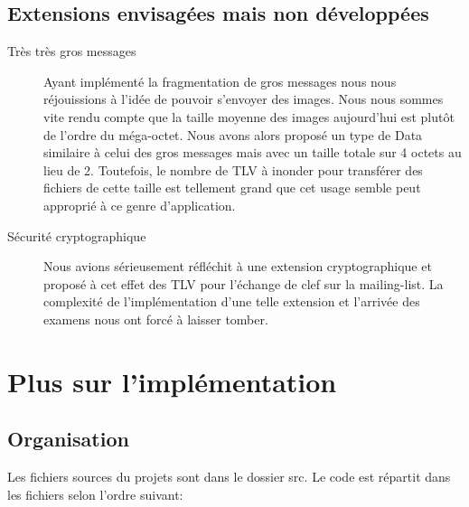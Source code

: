 \documentclass[a4paper,10pt]{article} %
\begin{document}
\subsection{Extensions envisagées mais non développées}

\begin{description}
\item[Très très gros messages] Ayant implémenté la fragmentation de gros messages nous nous réjouissions à l'idée de pouvoir s'envoyer des images. Nous nous sommes vite rendu compte que la taille moyenne des images aujourd'hui est plutôt de l'ordre du méga-octet. Nous avons alors proposé un type de Data similaire à celui des gros messages mais avec un taille totale sur 4 octets au lieu de 2. Toutefois, le nombre de TLV à inonder pour transférer des fichiers de cette taille est tellement grand que cet usage semble peut approprié à ce genre d'application.
\item[Sécurité cryptographique] Nous avions sérieusement réfléchit à une extension cryptographique et proposé à cet effet des TLV pour l'échange de clef sur la mailing-list. La complexité de l'implémentation d'une telle extension et l'arrivée des examens nous ont forcé à laisser tomber.
\end{description}

\section{Plus sur l'implémentation\label{sec:implem}}
\subsection{Organisation}

Les fichiers sources du projets sont dans le dossier \textrm{src}. Le code est répartit dans les fichiers selon l'ordre suivant:
\end{document}
